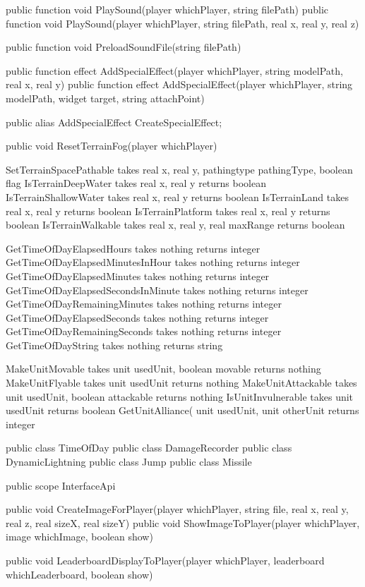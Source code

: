 {{		public function void PlaySound(player whichPlayer, string filePath)
		public function void PlaySound(player whichPlayer, string filePath, real x, real y, real z)

		public function void PreloadSoundFile(string filePath)

		public function effect AddSpecialEffect(player whichPlayer, string modelPath, real x, real y)
		public function effect AddSpecialEffect(player whichPlayer, string modelPath, widget target, string attachPoint)

		public alias AddSpecialEffect CreateSpecialEffect;

		public void ResetTerrainFog(player whichPlayer)

		SetTerrainSpacePathable takes real x, real y, pathingtype pathingType, boolean flag
		IsTerrainDeepWater takes real x, real y returns boolean
		IsTerrainShallowWater takes real x, real y returns boolean
		IsTerrainLand takes real x, real y returns boolean
		IsTerrainPlatform takes real x, real y returns boolean
		IsTerrainWalkable takes real x, real y, real maxRange returns boolean

		GetTimeOfDayElapsedHours takes nothing returns integer
		GetTimeOfDayElapsedMinutesInHour takes nothing returns integer
		GetTimeOfDayElapsedMinutes takes nothing returns integer
		GetTimeOfDayElapsedSecondsInMinute takes nothing returns integer
		GetTimeOfDayRemainingMinutes takes nothing returns integer
		GetTimeOfDayElapsedSeconds takes nothing returns integer
		GetTimeOfDayRemainingSeconds takes nothing returns integer
		GetTimeOfDayString takes nothing returns string

		MakeUnitMovable takes unit usedUnit, boolean movable returns nothing
		MakeUnitFlyable takes unit usedUnit returns nothing
		MakeUnitAttackable takes unit usedUnit, boolean attackable returns nothing
		IsUnitInvulnerable takes unit usedUnit returns boolean
		GetUnitAlliance( unit usedUnit, unit otherUnit returns integer

		public class TimeOfDay
		public class DamageRecorder
		public class DynamicLightning
		public class Jump
		public class Missile
	}

	public scope InterfaceApi
	{
		public void CreateImageForPlayer(player whichPlayer, string file, real x, real y, real z, real sizeX, real sizeY)
		public void ShowImageToPlayer(player whichPlayer, image whichImage, boolean show)

		public void LeaderboardDisplayToPlayer(player whichPlayer, leaderboard whichLeaderboard, boolean show)

}}
